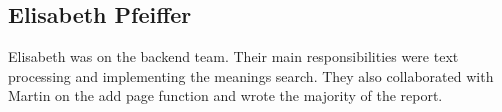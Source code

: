 \subsection{Elisabeth Pfeiffer}
Elisabeth was on the backend team. Their main responsibilities were text processing and implementing the meanings search. They also collaborated with Martin on the add page function and wrote the majority of the report. \\
